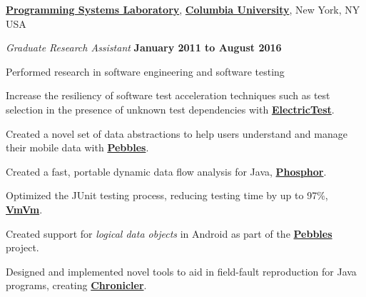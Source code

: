 \documentclass[10pt]{article}
\begin{document}
\href{http://www.psl.cs.columbia.edu/}{\textbf{Programming Systems Laboratory}}, \href{http://www.columbia.edu}{\textbf{Columbia University}},
New York, NY USA
\begin{outerlist}
\item[] \textit{Graduate Research Assistant}%
    \hfill \textbf{January 2011 to August 2016}
    \begin{innerlist}%
    \item Performed research in software engineering and software testing
    \item Increase the resiliency of software test acceleration techniques such as test selection in the presence of unknown test dependencies with \href{http://jonbell.net/publications/electrictest}{\textbf{ElectricTest}}. 
    	\item Created a novel set of data abstractions to help users understand and manage their mobile data with \href{http://jonbell.net/publications/pebbles}{\textbf{Pebbles}}.
            \item Created a fast, portable dynamic data flow analysis for Java, \href{http://jonbell.net/publications/phosphor}{\textbf{Phosphor}}.
            \item Optimized the JUnit testing process, reducing testing time by up to 97\%, \href{http://jonbell.net/publications/vmvm}{\textbf{VmVm}}.
           \item Created support for \emph{logical data objects} in Android as part of the \href{http://www.psl.cs.columbia.edu/1194/android-privacy/}{\textbf{Pebbles}} project.
        \item Designed and implemented novel tools to aid in field-fault reproduction for Java programs, creating \href{http://jonbell.net/publications/chronicler}{\textbf{Chronicler}}.
        \end{innerlist}

\end{outerlist}
\end{document}
